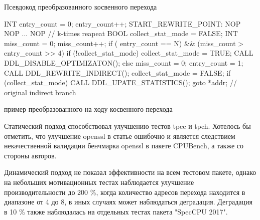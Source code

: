 \begin{ListingEnv}[!h]
	\captiondelim{ } %
	\caption{Псевдокод преобразованного косвенного перехода}\label{indirect_algo1}
	
	\begin{Verb}
		
		INT entry_count = 0;
		entry_count++;
		START_REWRITE_POINT:
		NOP
		NOP
		...
		NOP // k-times reapeat
		BOOL collect_stat_mode = FALSE;
		INT miss_count = 0;
		miss_count++;
		if ( entry_count == N)
		&& (miss_count > entry_count >> 4) {
			if (!collect_stat_mode){
				collect_stat_mode = TRUE;
				CALL DDL_DISABLE_OPTIMIZATON();
			} else {
				miss_count = 0;
				entry_count = 1;
				CALL DDL_REWRITE_INDIRECT();
				collect_stat_mode = FALSE;
			}
		}
		if (collect_stat_mode) {
			CALL DDL_UPATE_STATISTICS();
		}
		goto *addr; // original indirect branch
		
	\end{Verb}
\end{ListingEnv} 


\begin{ListingEnv}[!h]
	\captiondelim{ } %
	\caption{пример преобразованного на ходу косвенного перехода}\label{indirect_algo2}
	
\end{ListingEnv} 

Статический подход способствовал улучшению тестов tpcc и tpch. Хотелось бы отметить, что улучшение openssl в статье \cite{chernonog2023статический} ошибочно и является следствием некачественной валидации бенчмарка openssl в пакете CPUBench, а также со стороны авторов.

Динамический подход не показал эффективности на всем тестовом пакете, однако на небольших мотивационных тестах  наблюдается улучшение производительности до 200 \%, когда количество адресов перехода находится в диапазоне от 4 до 8, в иных случаях может наблюдаться деградация. Деградация в 10 \% также наблюдалась на отдельных тестах пакета "SpecCPU 2017".

